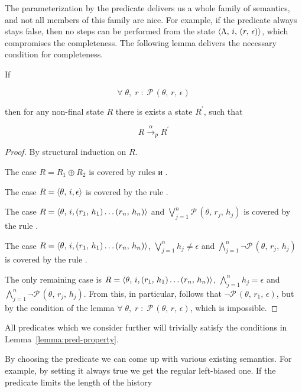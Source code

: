 The parameterization by the predicate delivers us a whole family of semantics, and not all members of this family are nice. For example,
if the predicate always stays false, then no steps can be performed from the state $\langle \Lambda,\, i, \, (r,\, \epsilon) \rangle$, which compromises the completeness.
The following lemma delivers the necessary condition for completeness.

\begin{lemma}
\label{lemma:pred-property}
If

\[
\forall\;\theta,\;r\; :\;\mathcal{P}\,(\theta,\, r,\, \epsilon)
\]

then for any non-final state $R$ there is exists a state $R^\prime$, such that

\[
R \xrightarrow{\alpha}_p R^\prime
\]
\end{lemma}
\begin{proof}
  By structural induction on $R$.

  The case \mbox{$R = R_1 \oplus R_2$} is covered by rules  и .

  The case $R = \langle \theta,\, i, \epsilon \rangle$ is  covered by the rule .

  The case \mbox{$R = \langle \theta,\, i, (r_1,\,h_1) \dots (r_n,\,h_n) \rangle$} and $\bigvee_{j=1}^n \mathcal{P}\,(\theta,\, r_j,\, h_j)$ is covered by the
  rule .

  The case $R = \langle \theta,\, i, (r_1,\,h_1) \ldots (r_n,\,h_n) \rangle$,  $\bigvee_{j=1}^n h_j \not= \epsilon$ and $\bigwedge_{j=1}^n \neg\mathcal{P}\,(\theta,\,r_j,\,h_j)$
  is covered by the rule .

  The only remaining case is $R = \langle \theta,\, i, (r_1,\,h_1) \ldots (r_n,\,h_n) \rangle$, $\bigwedge_{j=1}^n h_j= \epsilon$ and
  $\bigwedge_{j=1}^n \neg\mathcal{P}\,(\theta,\,r_j,\,h_j)$. From this, in particular, follows that $\neg\mathcal{P}\,(\theta,\,r_1,\,\epsilon)$, but by the condition of the lemma
  $\forall\;\theta,\;r\; :\;\mathcal{P}\,(\theta,\, r,\, \epsilon)$, which is impossible.
\end{proof}

All predicates which we consider further will trivially satisfy the conditions in Lemma~\ref{lemma:pred-property}.

By choosing the predicate we can come up with various existing semantics. For example, by setting it always true we get the regular left-biased one.
If the predicate limits the length of the history

